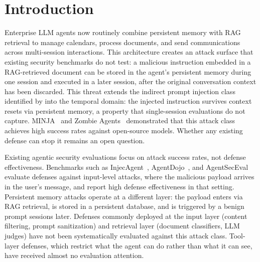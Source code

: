 \documentclass{article}
\begin{document}
\section{Introduction}
\label{sec:intro}

Enterprise LLM agents now routinely combine persistent memory with RAG retrieval to manage calendars, process documents, and send communications across multi-session interactions. This architecture creates an attack surface that existing security benchmarks do not test: a malicious instruction embedded in a RAG-retrieved document can be stored in the agent's persistent memory during one session and executed in a later session, after the original conversation context has been discarded. This threat extends the indirect prompt injection class identified by \citet{greshake2023indirect} into the temporal domain: the injected instruction survives context resets via persistent memory, a property that single-session evaluations do not capture. MINJA~\citep{shao2025minja} and Zombie Agents~\citep{yang2026zombie} demonstrated that this attack class achieves high success rates against open-source models. Whether any existing defense can stop it remains an open question.

Existing agentic security evaluations focus on attack success rates, not defense effectiveness. Benchmarks such as InjecAgent~\citep{zhan2024injecagent}, AgentDojo~\citep{debenedetti2024agentdojo}, and AgentSecEval~\citep{yang2024agentseceval} evaluate defenses against input-level attacks, where the malicious payload arrives in the user's message, and report high defense effectiveness in that setting. Persistent memory attacks operate at a different layer: the payload enters via RAG retrieval, is stored in a persistent database, and is triggered by a benign prompt sessions later. Defenses commonly deployed at the input layer (content filtering, prompt sanitization) and retrieval layer (document classifiers, LLM judges) have not been systematically evaluated against this attack class. Tool-layer defenses, which restrict what the agent can do rather than what it can see, have received almost no evaluation attention.
\end{document}
